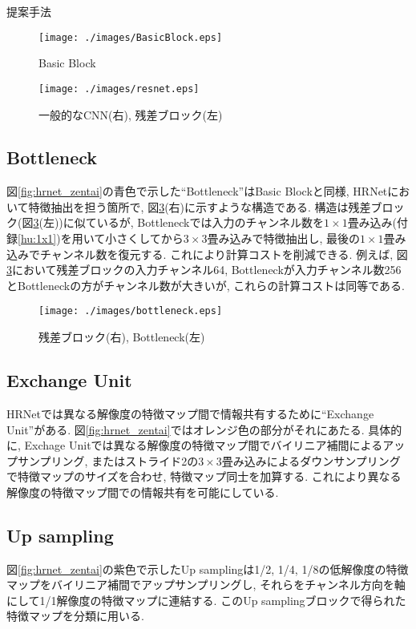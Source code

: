 \begin{chapter}{提案手法}
\begin{figure}[H]
  \centering
  \texttt{[image: ./images/BasicBlock.eps]}
  \caption{Basic Block}
  \label{fig:basicblock}
\end{figure}

\begin{figure}[H]
  \centering
  \texttt{[image: ./images/resnet.eps]}
  \caption{一般的なCNN(右), 残差ブロック(左)}
  \label{fig:res}
\end{figure}

\subsection{Bottleneck}\label{subsec:bottleneck}
図\ref{fig:hrnet_zentai}の青色で示した``Bottleneck''はBasic Blockと同様, HRNetにおいて特徴抽出を担う箇所で, 図\ref{fig:bot}(右)に示すような構造である. 構造は残差ブロック(図\ref{fig:bot}(左))に似ているが, Bottleneckでは入力のチャンネル数を$1\times1$畳み込み(付録\ref{hu:1x1})を用いて小さくしてから$3\times3$畳み込みで特徴抽出し, 最後の$1\times1$畳み込みでチャンネル数を復元する. これにより計算コストを削減できる. 例えば, 図\ref{fig:bot}において残差ブロックの入力チャンネル64, Bottleneckが入力チャンネル数256とBottleneckの方がチャンネル数が大きいが, これらの計算コストは同等である.
\begin{figure}[H]
  \centering
  \texttt{[image: ./images/bottleneck.eps]}
  \caption{残差ブロック(右), Bottleneck(左)}
  \label{fig:bot}
\end{figure}

\subsection{Exchange Unit}
HRNetでは異なる解像度の特徴マップ間で情報共有するために``Exchange Unit''がある. 図\ref{fig:hrnet_zentai}ではオレンジ色の部分がそれにあたる. 具体的に, Exchage Unitでは異なる解像度の特徴マップ間でバイリニア補間によるアップサンプリング, またはストライド2の$3\times3$畳み込みによるダウンサンプリングで特徴マップのサイズを合わせ, 特徴マップ同士を加算する. これにより異なる解像度の特徴マップ間での情報共有を可能にしている. 

\subsection{Up sampling}
図\ref{fig:hrnet_zentai}の紫色で示したUp samplingは1/2, 1/4, 1/8の低解像度の特徴マップをバイリニア補間でアップサンプリングし, それらをチャンネル方向を軸にして1/1解像度の特徴マップに連結する. このUp samplingブロックで得られた特徴マップを分類に用いる.


\end{chapter}
